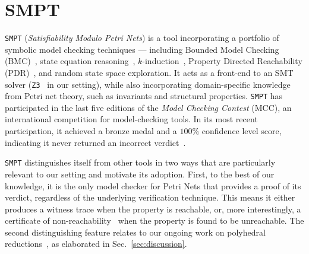 

\section{SMPT}
\label{appendix:smpt}



\texttt{SMPT} (\emph{Satisfiability Modulo Petri Nets}) is a tool incorporating a portfolio of symbolic model checking techniques --- including Bounded Model Checking (BMC)~\cite{BiCiClZh99}, state equation reasoning~\cite{Mu77}, $k$-induction~\cite{ShSiSt20}, Property Directed Reachability (PDR)~\cite{Br11,AmDaHu22}, and random state space exploration. It acts as a front-end to an SMT solver (\texttt{Z3}~\cite{DeBj08} in our setting), while also incorporating domain-specific knowledge from Petri net theory, such as invariants and structural properties. \texttt{SMPT} has participated in the last five editions of the \textit{Model Checking Contest} (MCC), an international competition for model-checking tools. In its most recent participation, it achieved a bronze medal and a $100\%$ confidence level score, indicating it never returned an incorrect verdict~\cite{mcc:2025}.

\texttt{SMPT} distinguishes itself from other tools in two ways that are particularly relevant to our setting and motivate its adoption. First, to the best of our knowledge, it is the only model checker for Petri Nets that provides a proof of its verdict, regardless of the underlying verification technique. This means it either produces a witness trace when the property is reachable, or, more interestingly, a certificate of non-reachability~\cite{AmDaHu22} when the property is found to be unreachable.
%
The second distinguishing feature relates to our ongoing work on polyhedral reductions~\cite{AmBeDa21}, as elaborated in Sec.~\ref{sec:discussion}.



